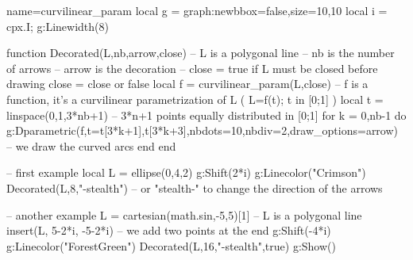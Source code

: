 \documentclass[border=5pt]{standalone}%
\begin{document}
\begin{luadraw}{name=curvilinear_param}
local g = graph:new{bbox=false,size={10,10}}
local i = cpx.I; g:Linewidth(8)

function Decorated(L,nb,arrow,close)
-- L is a polygonal line
-- nb is the number of arrows
-- arrow is the decoration
-- close = true if L must be closed before drawing
    close = close or false
    local f = curvilinear_param(L,close) -- f is a function, it's a curvilinear parametrization of L ( L={f(t); t in [0;1]} )
    local t = linspace(0,1,3*nb+1) -- 3*n+1 points equally distributed in [0;1]
    for k = 0,nb-1 do
        g:Dparametric(f,{t={t[3*k+1],t[3*k+3]},nbdots=10,nbdiv=2,draw_options=arrow}) -- we draw the curved arcs
    end
end

-- first example
local L = ellipse(0,4,2) 
g:Shift(2*i)
g:Linecolor("Crimson")
Decorated(L,8,"-stealth") -- or "stealth-" to change the direction of the arrows

-- another example
L = cartesian(math.sin,-5,5)[1] -- L is a polygonal line
insert(L, {5-2*i, -5-2*i}) -- we add two points at the end
g:Shift(-4*i)
g:Linecolor("ForestGreen")
Decorated(L,16,"-stealth",true)
g:Show()
\end{luadraw}
\end{document}
